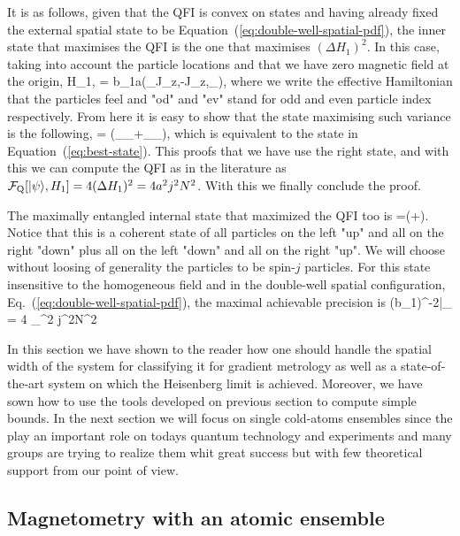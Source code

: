It is as follows, given that the QFI is convex on states and having already fixed the external spatial state to be Equation~(\ref{eq:double-well-spatial-pdf}), the inner state that maximises the QFI is the one that maximises $(\Delta H_1)^2$.
In this case, taking into account the particle locations and that we have zero magnetic field at the origin,
\be
  H_{1,} = b_1a(\mtxid_{}\otimes J_{z,}-J_{z,}\otimes \mtxid_{}),
\ee
where we write the effective Hamiltonian that the particles feel and "od" and "ev" stand for odd and even particle index respectively.
From here it is easy to show that the state maximising such variance is the following,
\be
  \ket{\psi} = (_{}\otimes{}_{}+_{}\otimes{}_{}),
\ee
which is equivalent to the state in Equation~(\ref{eq:best-state}).
This proofs that we have use the right state, and with this we can compute the QFI as in the literature as $\mathcal{F}_{\textnormal{Q}}[{\textstyle \vert \psi \rangle, H_1}] = 4(\Delta H_1)^2 = 4a^2j^2N^2$.
With this we finally conclude the proof.

The maximally entangled internal state that maximized the QFI too is
\be
  \label{eq:best-state}
  \ket{\psi}=(+).
\ee
Notice that this is a coherent state of all particles on the left "up" and all on the right "down" plus all on the left "down" and all on the right "up".
We will choose without loosing of generality the particles to be spin-$j$ particles.
For this state insensitive to the homogeneous field and in the double-well spatial configuration, Eq.~(\ref{eq:double-well-spatial-pdf}), the maximal achievable precision is
\be
  (\Delta b_1)^{-2}|_{\max} = 4 \sigma_{}^2 j^2N^2
\ee

In this section we have shown to the reader how one should handle the spatial width of the system for classifying it for gradient metrology as well as a state-of-the-art system on which the Heisenberg limit is achieved. Moreover, we have sown how to use the tools developed on previous section to compute simple bounds. In the next section we will focus on single cold-atoms ensembles since the play an important role on todays quantum technology and experiments and many groups are trying to realize them whit great success but with few theoretical support from our point of view.

\subsection{Magnetometry with an atomic ensemble}
\label{sec:single cloud systems}

